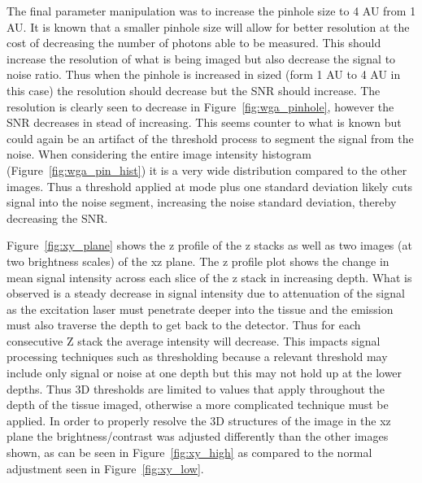 \documentclass[12pt]{article}
\begin{document}
The final parameter manipulation was to increase the pinhole size to 4 AU from 1 AU. It is known that a smaller pinhole size will allow for better resolution at the cost of decreasing the number of photons able to be measured. This should increase the resolution of what is being imaged but also decrease the signal to noise ratio. Thus when the pinhole is increased in sized (form 1 AU to 4 AU in this case) the resolution should decrease but the SNR should increase. The resolution is clearly seen to decrease in Figure~\ref{fig:wga_pinhole}, however the SNR decreases in stead of increasing. This seems counter to what is known but could again be an artifact of the threshold process to segment the signal from the noise. When considering the entire image intensity histogram (Figure~\ref{fig:wga_pin_hist}) it is a very wide distribution compared to the other images. Thus a threshold applied at mode plus one standard deviation likely cuts signal into the noise segment, increasing the noise standard deviation, thereby decreasing the SNR.

Figure~\ref{fig:xy_plane} shows the z profile of the z stacks as well as two images (at two brightness scales) of the xz plane. The z profile plot shows the change in mean signal intensity across each slice of the z stack in increasing depth. What is observed is a steady decrease in signal intensity due to attenuation of the signal as the excitation laser must penetrate deeper into the tissue and the emission must also traverse the depth to get back to the detector. Thus for each consecutive Z stack the average intensity will decrease. This impacts signal processing techniques such as thresholding because a relevant threshold may include only signal or noise at one depth but this may not hold up at the lower depths. Thus 3D thresholds are limited to values that apply throughout the depth of the tissue imaged, otherwise a more complicated technique must be applied. In order to properly resolve the 3D structures of the image in the xz plane the brightness/contrast was adjusted differently than the other images shown, as can be seen in Figure~\ref{fig:xy_high} as compared to the normal adjustment seen in Figure~\ref{fig:xy_low}.
\end{document}
